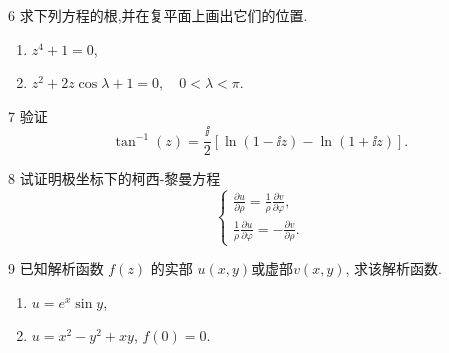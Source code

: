 \documentclass[11pt]{article}
\begin{document}
\vspace{0.5cm}

\begin{hwproblem}{6}
  求下列方程的根,并在复平面上画出它们的位置.
  \begin{enumerate}
    \item $z^4 + 1 = 0$,
    \item $z^2 + 2 z \cos \lambda + 1 = 0, \quad 0 < \lambda < \pi$.
  \end{enumerate}
\end{hwproblem}

\vspace{0.5cm}

\begin{hwproblem}{7}
验证
$$
\tan^{-1}(z)=\frac{\ii }{2}[\ln (1-\ii z)-\ln (1+\ii z)] .
$$
\end{hwproblem}

\vspace{0.5cm}

\begin{hwproblem}{8}
  试证明极坐标下的柯西-黎曼方程
  $$
    \left\{\begin{array}{l}
    \frac{\partial u}{\partial \rho}=\frac{1}{\rho} \frac{\partial v}{\partial \varphi} ,\\
    \frac{1}{\rho} \frac{\partial u}{\partial \varphi}=-\frac{\partial v}{\partial \rho} .
    \end{array}\right.
  $$
\end{hwproblem}

\vspace{0.5cm}

\begin{hwproblem}{9}
  已知解析函数 $f(z)$  的实部 $u(x, y)$或虚部$ v(x, y)$, 求该解析函数.
  \begin{enumerate}
    \item $u = e^x \sin{y}$,
    \item $u = x^2 - y^2 + xy$, $f(0) = 0$.
  \end{enumerate}
\end{hwproblem}


\hwrequirements
\end{document}
